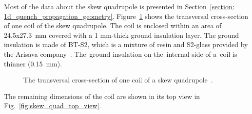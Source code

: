 
Most of the data about the skew quadrupole is presented in Section~\ref{section: 1d_quench_propagation_geometry}. Figure~\ref{fig:skew_quad_transversal_cross_section} shows the transversal cross-section of one coil of the skew quadrupole. The coil is enclosed within an area of 24.5x27.3~mm covered with a 1 mm-thick ground insulation layer. The ground insulation is made of BT-S2, which is a mixture of resin and S2-glass provided by the Arisava company~\cite{arisawa_company}. The~ground insulation on the~internal side of a~coil is thinner (0.15~mm).

\begin{figure}[H]
    \centering
    \caption{The transversal cross-section of one coil of a skew quadrupole~\cite{samuele_mariotto_mails}.}
    \label{fig:skew_quad_transversal_cross_section}
\end{figure}

The remaining dimensions of the coil are shown in its top view in Fig.~\ref{fig:skew_quad_top_view}.

